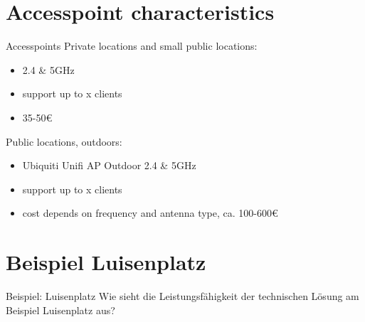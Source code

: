\documentclass{beamer}
\begin{document}
\section{Accesspoint characteristics}
\begin{frame}{Accesspoints}
\vfill
Private locations and small public locations:
\begin{itemize}
\item 2.4 \& 5GHz
\item support up to x clients
\item 35-50\euro{}
\end{itemize}
\vfill

Public locations, outdoors:
\begin{itemize}
\item Ubiquiti Unifi AP Outdoor 2.4 \& 5GHz
\item support up to x clients
\item cost depends on frequency and antenna type, ca. 100-600\euro{}
\end{itemize}
\vfill
\end{frame}

\section{Beispiel Luisenplatz}
\begin{frame}{Beispiel: Luisenplatz}
Wie sieht die Leistungsfähigkeit der technischen Lösung am Beispiel Luisenplatz aus?
\end{frame}
\end{document}
